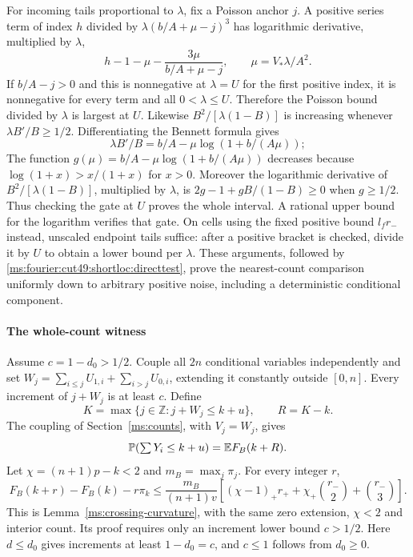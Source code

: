 For incoming tails proportional to $\lambda$, fix a Poisson anchor $j$.
A positive series term of index $h$ divided by
$\lambda(b/A+\mu-j)^3$ has logarithmic derivative, multiplied by $\lambda$,
\[
 h-1-\mu-\frac{3\mu}{b/A+\mu-j},\qquad \mu=V_*\lambda/A^2.
\]
If $b/A-j>0$ and this is nonnegative at $\lambda=U$ for the first positive
index, it is nonnegative for every term and all $0<\lambda\le U$.
Therefore the Poisson bound divided by $\lambda$ is largest at $U$.
Likewise $B^2/[\lambda(1-B)]$ is increasing whenever
$\lambda B'/B\ge1/2$. Differentiating the Bennett formula gives
\[
 \lambda B'/B=b/A-\mu\log(1+b/(A\mu));
\]
The function $g(\mu)=b/A-\mu\log(1+b/(A\mu))$ decreases because
$\log(1+x)>x/(1+x)$ for $x>0$. Moreover the logarithmic derivative of
$B^2/[\lambda(1-B)]$, multiplied by $\lambda$, is
$2g-1+gB/(1-B)\ge0$ when $g\ge1/2$. Thus checking the gate at $U$
proves the whole interval. A rational upper bound for the logarithm
verifies that gate. On cells using the fixed positive bound $l_fr_-$ instead,
unscaled endpoint tails suffice: after a positive bracket is checked, divide
it by $U$ to obtain a lower bound per $\lambda$. These arguments, followed by
\eqref{ms:fourier:cut49:shortloc:directtest}, prove the nearest-count comparison uniformly down to arbitrary positive
noise, including a deterministic conditional component.

\paragraph{The whole-count witness}

Assume $c=1-d_0>1/2$. Couple all $2n$ conditional variables independently and
set $W_j=\sum_{i\le j}U_{1,i}+\sum_{i>j}U_{0,i}$, extending it constantly
outside $[0,n]$. Every increment of $j+W_j$ is at least $c$. Define
\[
 K=\max\{j\in\mathbb Z:j+W_j\le k+u\},\qquad R=K-k.
\]
The coupling of Section~\ref{ms:counts}, with $V_j=W_j$, gives
\begin{equation}\label{ms:fourier:cut49:shortloc:cutoff}
                  \mathbb P(\textstyle\sum Y_i\le k+u)=\mathbb E F_B(k+R).
\end{equation}
Let $\chi=(n+1)p-k<2$ and $m_B=\max_j\pi_j$. For every integer $r$,
\begin{equation}\label{ms:fourier:cut49:shortloc:curvature}
 F_B(k+r)-F_B(k)-r\pi_k\le\frac{m_B}{(n+1)v}
 \left[(\chi-1)_+r_++\chi_+\binom{r_-}{2}+\binom{r_-}{3}\right].
\end{equation}
This is Lemma~\ref{ms:crossing-curvature}, with the same zero extension,
$\chi<2$ and interior count. Its proof requires only an increment lower
bound $c>1/2$. Here $d\le d_0$ gives increments at least $1-d_0=c$,
and $c\le1$ follows from $d_0\ge0$.


